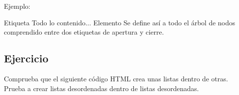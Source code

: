 \documentclass[letterpaper,10pt,spanish]{sphinxmanual}
\begin{document}
Ejemplo:

\begin{sphinxVerbatim}[commandchars=\\\{\}]
        Etiqueta
        Todo lo contenido...
        Elemento
                Se define así a todo el árbol
                de nodos comprendido
                entre dos etiquetas
                de apertura y cierre.
\end{sphinxVerbatim}


\subsection{Ejercicio}
\label{\detokenize{tema2:ejercicio}}
Comprueba que el siguiente código HTML crea unas listas dentro de otras. Prueba a crear listas desordenadas dentro de listas desordenadas.
\end{document}
